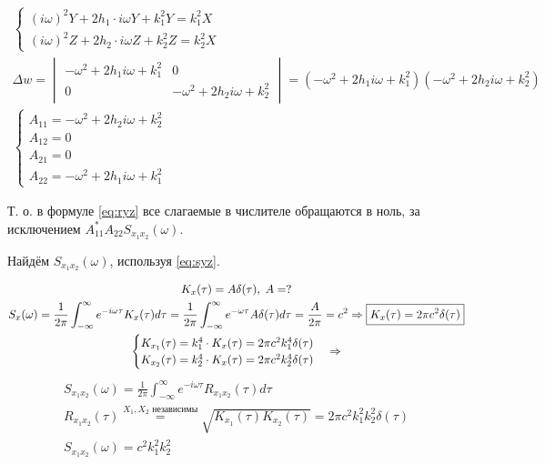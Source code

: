 \documentclass[a4paper,12pt]{article}
\begin{document}
\begin{gather*}
    \begin{cases}
        (i\omega)^2 Y + 2 h_1 \cdot i\omega Y + k_1^2 Y = k_1^2 X \\
        (i\omega)^2 Z + 2 h_2 \cdot i\omega Z + k_2^2 Z = k_2^2 X
    \end{cases} \\
    \Delta w = \begin{vmatrix}
        - \omega^2 + 2 h_1 i \omega + k_1^2 & 0 \\
        0 & - \omega^2 + 2 h_2 i \omega + k_2^2
    \end{vmatrix} = (- \omega^2 + 2 h_1 i \omega + k_1^2)(- \omega^2 + 2 h_2 i \omega + k_2^2) \\
    \begin{cases}
        A_{11} = - \omega^2 + 2 h_2 i \omega + k_2^2 \\
        A_{12} = 0 \\
        A_{21} = 0 \\
        A_{22} = - \omega^2 + 2 h_1 i \omega + k_1^2
    \end{cases}
\end{gather*}

Т. о. в формуле \eqref{eq:ryz} все слагаемые в числителе обращаются в ноль, за исключением $ A_{11}^* A_{22} S_{x_1 x_2}(\omega)$.

Найдём $ S_{x_1 x_2}(\omega) $, используя \eqref{eq:syz}.

\begin{gather*}
    K_x(\tau) = A \delta(\tau), \thickspace A = ? \\
    S_x(\omega) = \frac{1}{2 \pi} \int_{-\infty}^\infty e^{- i \omega \tau} K_x(\tau) d \tau = \frac{1}{2 \pi} \int_{-\infty}^\infty e^{- \omega \tau} A \delta(\tau) d \tau = \frac{A}{2 \pi} = c^2 \Rightarrow \boxed{K_x(\tau) = 2 \pi c^2 \delta(\tau)} \\
    \begin{cases}
        K_{x_1}(\tau) = k_1^4 \cdot K_x(\tau) = 2 \pi c^2 k_1^4 \delta(\tau) \\
        K_{x_2}(\tau) = k_2^4 \cdot K_x(\tau) = 2 \pi c^2 k_2^4 \delta(\tau)
    \end{cases} \Rightarrow
\end{gather*}
\begin{gather*}
    S_{x_1 x_2}(\omega) = \frac{1}{2\pi}  \int_{-\infty}^\infty e^{- i \omega \tau} R_{x_1 x_2}(\tau) d \tau \\
    R_{x_1 x_2}(\tau) \overset{X_1,X_2\text{ независимы}}= \sqrt{K_{x_1}(\tau) K_{x_2}(\tau)} = 2 \pi c^2 k_1^2 k_2^2 \delta(\tau) \\
    \boxed{S_{x_1 x_2}(\omega) = c^2 k_1^2 k_2^2}
\end{gather*}
\end{document}
